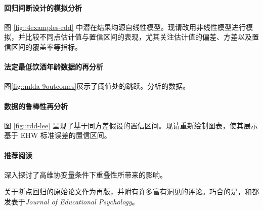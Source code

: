 \paragraph{回归间断设计的模拟分析}

图 \ref{fig::4examples-rdd} 中潜在结果均源自线性模型。现请改用非线性模型进行模拟，并比较不同点估计值与置信区间的表现，尤其关注估计值的偏差、方差以及置信区间的覆盖率等指标。 



\paragraph{法定最低饮酒年龄数据的再分析}\label{hw::MLDA}


图\ref{fig::mlda-9outcomes}展示了阈值处的跳跃。分析\citet{carpenter2009effect}的数据。

\paragraph{\citet{lee2008randomized} 数据的鲁棒性再分析}\label{hw::lee2008-robust}

图 \ref{fig::rdd-lee} 呈现了基于同方差假设的置信区间。现请重新绘制图表，使其展示基于 EHW 标准误差的置信区间。 




\paragraph{推荐阅读}

\citet{d2017overlap} 深入探讨了高维协变量条件下重叠性所带来的影响。 

\citet{thistlethwaite1960regression}关于断点回归的原始论文作为\citet{thistlewaiteregression2016obs}再版，并附有许多富有洞见的评论。巧合的是，\citet{thistlethwaite1960regression}和\citet{Rubin:1974}都发表于{\it Journal of Educational Psychology}。
